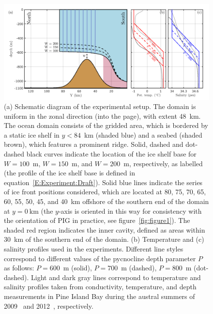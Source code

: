 \documentclass[draft]{agujournal2019}
\begin{document}
\begin{figure}
    \centering
    \includegraphics[width = \textwidth]{../make_figures/plots/figure2.pdf}
    \caption{(a) Schematic diagram of the experimental setup. The domain is uniform in the zonal direction (into the page), with extent 48~km. The ocean domain consists of the gridded area, which is bordered by a static ice shelf in $y < 84$~km (shaded blue) and a seabed (shaded brown), which features a prominent ridge. Solid, dashed and dot-dashed black curves indicate the location of the ice shelf base for $W=100$~m, $W=150$~m, and $W=200$~m, respectively, as labelled (the profile of the ice shelf base is defined in equation~\eqref{E:Experiment:Draft}). Solid blue lines indicate the series of ice front positions considered, which are located at 80, 75, 70, 65, 60, 55, 50, 45, and 40~km offshore of the southern end of the domain at $y = 0~\text{km}$ (the $y$-axis is oriented in this way for consistency with the orientation of PIG in practice, see figure~\ref{fig:figure1}). The shaded red region indicates the inner cavity, defined as areas within 30~km of the southern end of the domain. (b) Temperature and (c) salinity profiles used in the experiments. Different line styles correspond to different values of the pycnocline depth parameter $P$ as follows: $P=600$~m (solid), $P=700$~m (dashed), $P=800$~m (dot-dashed). Light and dark gray lines correspond to temperature and salinity profiles taken from conductivity, temperature, and depth measurements in Pine Island Bay during the austral summers of 2009~\cite{Jacobs2011NatureGeosci} and 2012~\cite{Dutrieux2014Science}, respectively.}
    \label{fig:figure2}
\end{figure}
\end{document}
